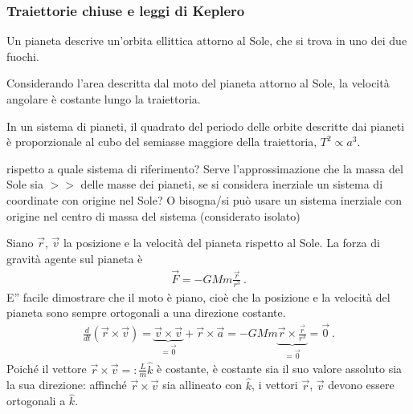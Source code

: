 \documentclass[letterpaper,10pt,italian]{jupyterBook}
\begin{document}
\subsubsection{Traiettorie chiuse e leggi di Keplero}
\label{\detokenize{ch/mechanics/dynamics-motion-gravitation:traiettorie-chiuse-e-leggi-di-keplero}}\label{\detokenize{ch/mechanics/dynamics-motion-gravitation:physics-hs-mechanics-dynamics-motion-gravitation-two-bodies-kepler}}
\sphinxAtStartPar
{} Un pianeta descrive un’orbita ellittica attorno al Sole, che si trova in uno dei due fuochi.

\sphinxAtStartPar
{} Considerando l’area descritta dal moto del pianeta attorno al Sole, la velocità angolare è costante lungo la traiettoria.

\sphinxAtStartPar
{} In un sistema di pianeti, il quadrato del periodo delle orbite descritte dai pianeti è proporzionale al cubo del semiasse maggiore della traiettoria, \(T^2 \propto a^3\).

\sphinxAtStartPar
{} rispetto a quale sistema di riferimento? Serve l’approssimazione che la massa del Sole sia \(>>\) delle masse dei pianeti, se si considera inerziale un sistema di coordinate con origine nel Sole? O bisogna/si può usare un sistema inerziale con origine nel centro di massa del sistema (considerato isolato)

\sphinxAtStartPar
{} Siano \(\vec{r}\), \(\vec{v}\) la posizione e la velocità del pianeta rispetto al Sole. La forza di gravità agente sul pianeta è
\begin{equation*}
\begin{split}\vec{F} = - G M m \frac{\vec{r}}{r^3} \ .\end{split}
\end{equation*}
\sphinxAtStartPar
E” facile dimostrare che il moto è piano, cioè che la posizione e la velocità del pianeta sono sempre ortogonali a una direzione costante.
\begin{equation*}
\begin{split}\frac{d}{dt} \left( \vec{r} \times \vec{v} \right) = \underbrace{\vec{v} \times \vec{v}}_{=\vec{0}} + \vec{r} \times \vec{a}  = - G M m \underbrace{\vec{r} \times \frac{\vec{r}}{r^3}}_{=\vec{0}} = \vec{0} \ .\end{split}
\end{equation*}
\sphinxAtStartPar
Poiché il vettore \(\vec{r} \times \vec{v} =: \frac{L}{m} \hat{k}\) è costante, è costante sia il suo valore assoluto sia la sua direzione: affinché \(\vec{r} \times \vec{v}\) sia allineato con \(\hat{k}\), i vettori \(\vec{r}\), \(\vec{v}\) devono essere ortogonali a \(\hat{k}\).
\end{document}
